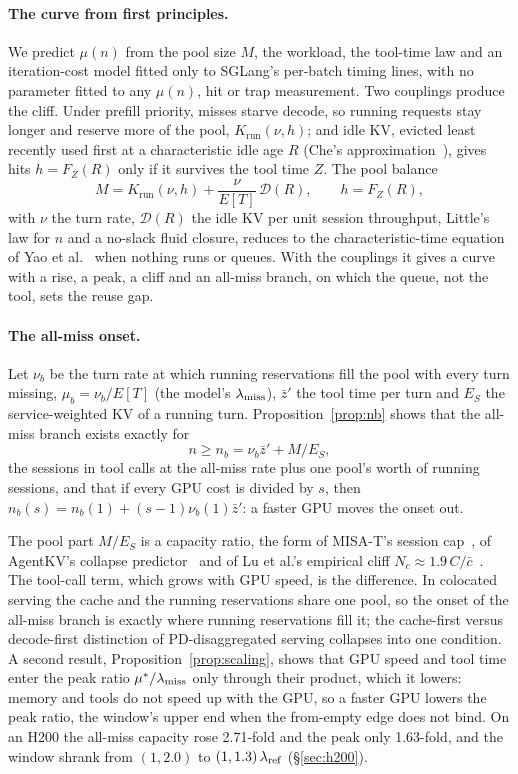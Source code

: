 \paragraph{The curve from first principles.} We predict $\mu(n)$ from the pool size $M$, the workload, the tool-time law and an
iteration-cost model fitted only to SGLang's per-batch timing lines, with no parameter fitted to any $\mu(n)$, hit or trap
measurement. Two couplings produce the cliff. Under prefill priority, misses starve decode, so running requests
stay longer and reserve more of the pool, $K_{\mathrm{run}}(\nu,h)$; and idle KV, evicted least recently used first at a
characteristic idle age $R$ (Che's approximation~\citep{che2002hierarchical}), gives hits $h=F_Z(R)$ only if it survives the tool
time $Z$. The pool balance
\[
M=K_{\mathrm{run}}(\nu,h)+\frac{\nu}{E[T]}\,\mathcal D(R),\qquad h=F_Z(R),
\]
with $\nu$ the turn rate, $\mathcal D(R)$ the idle KV per unit session throughput, Little's law for $n$ and a no-slack fluid
closure, reduces to the characteristic-time equation of Yao et al.~\citep{yao2026multiturn} when nothing runs or queues. With the
couplings it gives a curve with a rise, a peak, a cliff and an all-miss branch, on which the queue, not the tool, sets the reuse gap.

\paragraph{The all-miss onset.} Let $\nu_b$ be the turn rate at which running reservations fill the pool with every turn
missing, $\mu_b=\nu_b/E[T]$ (the model's $\lambda_{\mathrm{miss}}$), $\bar z'$ the tool time per turn and $E_S$ the service-weighted KV of a running
turn. Proposition~\ref{prop:nb} shows that the all-miss branch exists exactly for
\[
n\ge n_b=\nu_b\bar z'+M/E_S ,
\]
the sessions in tool calls at the all-miss rate plus one pool's worth of running sessions, and that if every GPU cost is divided by
$s$, then $n_b(s)=n_b(1)+(s-1)\nu_b(1)\bar z'$: a faster GPU moves the onset out.

The pool part $M/E_S$ is a capacity ratio, the form of MISA-T's session cap~\citep{hong2026misat}, of AgentKV's collapse
predictor~\citep{anon2026agentkv} and of Lu et al.'s empirical cliff $N_c\approx1.9\,C/\bar c$~\citep{lu2026cachetrap}. The
tool-call term, which grows with GPU speed, is the difference. In colocated serving the cache and the running reservations share
one pool, so the onset of the all-miss branch is exactly where running reservations fill it; the cache-first versus decode-first
distinction of PD-disaggregated serving collapses into one condition. A second result, Proposition~\ref{prop:scaling}, shows that
GPU speed and tool time enter the peak ratio $\mu^*/\lambda_{\mathrm{miss}}$ only through their product, which it lowers: memory and tools do not
speed up with the GPU, so a faster GPU lowers the peak ratio, the window's upper end when the from-empty edge does not bind. On an H200 the all-miss capacity rose 2.71-fold and the peak only
1.63-fold, and the window shrank from $(1,2.0)$ to $(1,1.3)\,\lambda_{\mathrm{ref}}$ (\S\ref{sec:h200}).

